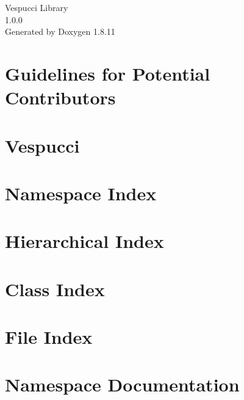 \documentclass[twoside]{book}
\newcommand{\+}{\discretionary{\mbox{\scriptsize$\hookleftarrow$}}{}{}}
\newcommand{\clearemptydoublepage}{%
  \newpage{\pagestyle{empty}\cleardoublepage}%
}
\begin{document}
\hypersetup{pageanchor=false,
             bookmarksnumbered=true,
             pdfencoding=unicode
            }
\begin{titlepage}
\vspace*{7cm}
\begin{center}%
{\Large Vespucci Library \\[1ex]\large 1.\+0.\+0 }\\
\vspace*{1cm}
{\large Generated by Doxygen 1.8.11}\\
\end{center}
\end{titlepage}
\clearemptydoublepage
\tableofcontents
\clearemptydoublepage
{}
\hypersetup{pageanchor=true}

\chapter{Guidelines for Potential Contributors}
\label{md_CONTRIBUTING}
\hypertarget{md_CONTRIBUTING}{}

\chapter{Vespucci}
\label{md_README}
\hypertarget{md_README}{}

\chapter{Namespace Index}

\chapter{Hierarchical Index}

\chapter{Class Index}

\chapter{File Index}

\chapter{Namespace Documentation}







\end{document}
